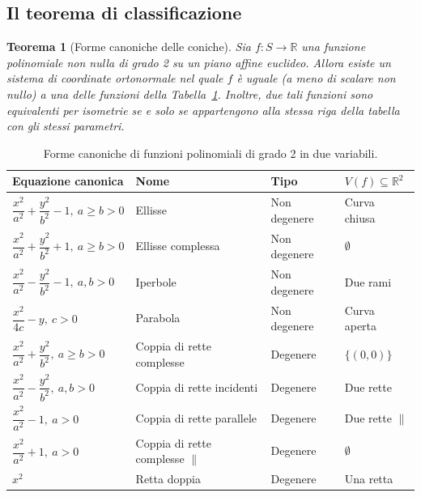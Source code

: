 \documentclass[11pt, a4paper]{book}
\theoremstyle{definition}
\theoremstyle{plain}
\newtheorem{teorema}[definizione]{Teorema}
\theoremstyle{remark}
\newcommand{\R}{\mathbb{R}}
\begin{document}
\subsection{Il teorema di classificazione}

\begin{teorema}[Forme canoniche delle coniche]
\label{thm:forme-canoniche-2d}
Sia $f \colon S \to \R$ una funzione polinomiale non nulla di grado 2 su un piano affine euclideo. Allora esiste un sistema di coordinate ortonormale nel quale $f$ è uguale (a meno di scalare non nullo) a una delle funzioni della Tabella~\ref{tab:forme-can-2d}. Inoltre, due tali funzioni sono equivalenti per isometrie se e solo se appartengono alla stessa riga della tabella con gli stessi parametri.
\end{teorema}

\begin{table}[h!]
\centering
\caption{Forme canoniche di funzioni polinomiali di grado 2 in due variabili.}
\label{tab:forme-can-2d}
\renewcommand{\arraystretch}{1.6}
\begin{tabular}{llll}
\toprule
\textbf{Equazione canonica} & \textbf{Nome} & \textbf{Tipo} & \textbf{$V(f) \subseteq \R^2$} \\
\midrule
$\dfrac{x^2}{a^2}+\dfrac{y^2}{b^2}-1,\ a\geq b>0$ & Ellisse & Non degenere & Curva chiusa \\[4pt]
$\dfrac{x^2}{a^2}+\dfrac{y^2}{b^2}+1,\ a\geq b>0$ & Ellisse complessa & Non degenere & $\emptyset$ \\[4pt]
$\dfrac{x^2}{a^2}-\dfrac{y^2}{b^2}-1,\ a,b>0$ & Iperbole & Non degenere & Due rami \\[4pt]
$\dfrac{x^2}{4c}-y,\ c>0$ & Parabola & Non degenere & Curva aperta \\[4pt]
\midrule
$\dfrac{x^2}{a^2}+\dfrac{y^2}{b^2},\ a\geq b>0$ & Coppia di rette complesse & Degenere & $\{(0,0)\}$ \\[4pt]
$\dfrac{x^2}{a^2}-\dfrac{y^2}{b^2},\ a,b>0$ & Coppia di rette incidenti & Degenere & Due rette \\[4pt]
$\dfrac{x^2}{a^2}-1,\ a>0$ & Coppia di rette parallele & Degenere & Due rette $\|$ \\[4pt]
$\dfrac{x^2}{a^2}+1,\ a>0$ & Coppia di rette complesse $\|$ & Degenere & $\emptyset$ \\[4pt]
$x^2$ & Retta doppia & Degenere & Una retta \\
\bottomrule
\end{tabular}
\end{table}
\end{document}
